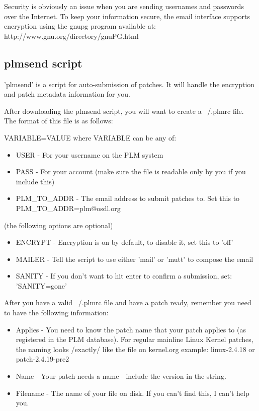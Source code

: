 Security is obviously an issue when you are sending usernames and passwords
over the Internet.  To keep your information secure, the email interface supports
encryption using the gnupg program available at: http://www.gnu.org/directory/gnuPG.html

\subsection{plmsend script}
'plmsend' is a script for auto-submission of patches.  It will handle the 
encryption and patch metadata information for you.

After downloading the plmsend script, you will want to create a ~/.plmrc file.
The format of this file is as follows:

VARIABLE=VALUE where VARIABLE can be any of:
\begin{itemize}
\item USER - For your username on the PLM system
\item PASS - For your account (make sure the file is readable only by you if
         you include this)
\item PLM\_TO\_ADDR - The email address to submit patches to.  Set this to
PLM\_TO\_ADDR=plm@osdl.org
\end{itemize}
(the following options are optional)

\begin{itemize}
\item ENCRYPT - Encryption is on by default, to disable it, set this to 'off'
\item MAILER - Tell the script to use either 'mail' or 'mutt' to compose the email
\item SANITY - If you don't want to hit enter to confirm a submission, set:
           'SANITY=gone'
\end{itemize}

After you have a valid ~/.plmrc file and have a patch ready, remember you need
to have the following information:

\begin{itemize}
\item Applies - You need to know the patch name that your patch applies to (as
registered in the PLM database).  For regular mainline Linux Kernel
patches, the naming looks /exactly/ like the file on kernel.org
example:  linux-2.4.18  or  patch-2.4.19-pre2
\item Name - Your patch needs a name - include the version in the string.
\item Filename - The name of your file on disk.  If you can't find this, I can't
             help you.
\end{itemize}

